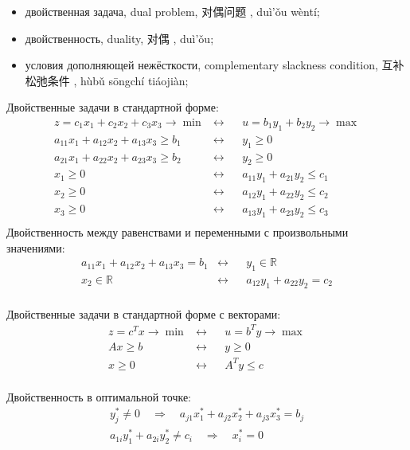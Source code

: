 \documentclass[12pt, a4paper]{article}
\renewcommand{\leq}{\leqslant}
\renewcommand{\geq}{\geqslant}
\newcommand{\RR}{\mathbb{R}}
\newcommand{\chinesetext}[1]{\setmainfont{Source Han Sans CN}
#1
\setmainfont{Linux Libertine O}}
\newcounter{problem}[section]
\begin{document}
\begin{leftbar}
  \noindent
  \begin{itemize}
  \item двойственная задача, dual problem, \chinesetext{对偶问题}, duì'ǒu wèntí;
  \item двойственность, duality, \chinesetext{对偶}, duì'ǒu;
  \item условия дополняющей нежёсткости, complementary slackness condition, \chinesetext{互补松弛条件}, hùbǔ sōngchí tiáojiàn;
  \end{itemize}

  Двойственные задачи в стандартной форме:
  \begin{align*}
    &z = c_1 x_1 + c_2 x_2 + c_3 x_3 \to \min & \leftrightarrow && u = b_1 y_1 + b_2 y_2 \to \max & \\
    &a_{11} x_1 + a_{12} x_2 + a_{13} x_3 \geq b_1 & \leftrightarrow && y_1 \geq 0 &\\
    &a_{21} x_1 + a_{22} x_2 + a_{23} x_3  \geq  b_2 & \leftrightarrow && y_2 \geq 0 &\\
    &x_1 \geq 0 & \leftrightarrow && a_{11} y_1 + a_{21} y_2 \leq c_1 & \\
    &x_2 \geq 0 & \leftrightarrow && a_{12} y_1 + a_{22} y_2 \leq c_2 & \\
    &x_3 \geq 0 & \leftrightarrow && a_{13} y_1 + a_{23} y_2 \leq c_3 & \\
  \end{align*}
  Двойственность между равенствами и переменными с произвольными значениями:
  \begin{align*}
    &a_{11} x_1 + a_{12} x_2 + a_{13} x_3 = b_1 & \leftrightarrow && y_1 \in \RR &\\
    &x_2 \in \RR & \leftrightarrow && a_{12} y_1 + a_{22} y_2 = c_2 & \\
  \end{align*}

  Двойственные задачи в стандартной форме с векторами:
  \begin{align*}
    &z = c^T x \to \min & \leftrightarrow && u = b^T y \to \max & \\
    & A x \geq b & \leftrightarrow && y \geq 0 &\\
    &x \geq 0 & \leftrightarrow && A^T y \leq c & \\
  \end{align*}

  Двойственность в оптимальной точке:
  \begin{align*}
    y_j^* \neq 0 \quad \Rightarrow \quad a_{j1} x_1^* + a_{j2} x_2^* + a_{j3} x_3^* = b_j  \\
    a_{1i} y_1^* + a_{2i} y_2^* \neq c_i \quad \Rightarrow \quad x_i^* = 0 \\
  \end{align*}  
\end{leftbar}
\end{document}
